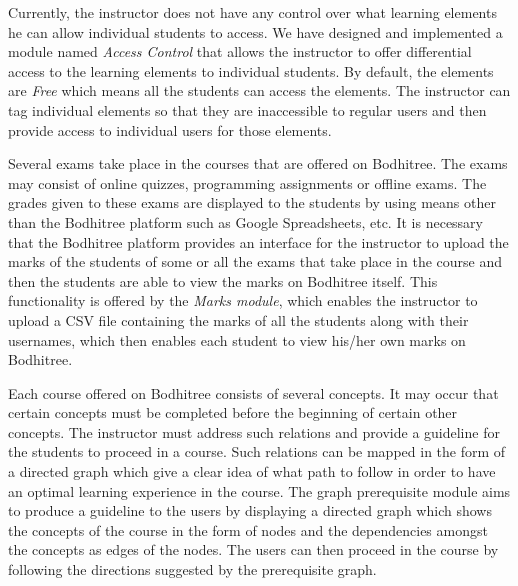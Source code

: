 \par Currently, the instructor does not have any control over what learning elements he can allow individual students to access. We have designed and implemented a module named \textit{Access Control} that allows the instructor to offer differential access to the learning elements to individual students. By default, the elements are \textit{Free} which means all the students can access the elements. The instructor can tag individual elements so that they are inaccessible to regular users and then provide access to individual users for those elements.

\par Several exams take place in the courses that are offered on Bodhitree. The exams may consist of online quizzes, programming assignments or offline exams. The grades given to these exams are displayed to the students by using means other than the Bodhitree platform such as Google Spreadsheets, etc. It is necessary that the Bodhitree platform provides an interface for the instructor to upload the marks of the students of some or all the exams that take place in the course and then the students are able to view the marks on Bodhitree itself. This functionality is offered by the \textit{Marks module}, which enables the instructor to upload a CSV file containing the marks of all the students along with their usernames, which then enables each student to view his/her own marks on Bodhitree.

\par Each course offered on Bodhitree consists of several concepts. It may occur that certain concepts must be completed before the beginning of certain other concepts. The instructor must address such relations and provide a guideline for the students to proceed in a course. Such relations can be mapped in the form of a directed graph which give a clear idea of what path to follow in order to have an optimal learning experience in the course. The graph prerequisite module aims to produce a guideline to the users by displaying a directed graph which shows the concepts of the course in the form of nodes and the dependencies amongst the concepts as edges of the nodes. The users can then proceed in the course by following the directions suggested by the prerequisite graph.
